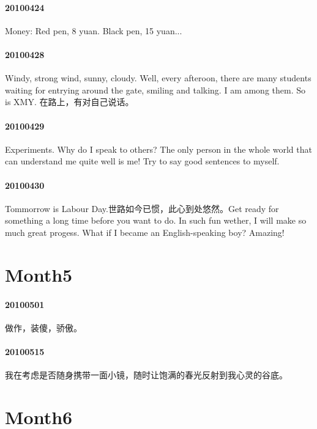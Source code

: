 \documentclass[UTF8]{book}
\begin{document}
\paragraph{20100424}

Money: Red pen, 8 yuan. Black pen, 15 yuan...


\paragraph{20100428}

Windy, strong wind, sunny, cloudy. 
Well, every afteroon, there are many students waiting for entrying around the gate, smiling and talking. I am among them. So is XMY.
在路上，有对自己说话。


\paragraph{20100429}

Experiments. Why do I speak to others? The only person in the whole world that can understand me quite well is me! Try to say good sentences to myself.


\paragraph{20100430}

Tommorrow is Labour Day.世路如今已惯，此心到处悠然。Get ready for something a long time before you want to do. In such fun wether, I will make so much great progess. What if I became an English-speaking boy? Amazing!


\section{Month5}
\paragraph{20100501}

做作，装傻，骄傲。


\paragraph{20100515}

我在考虑是否随身携带一面小镜，随时让饱满的春光反射到我心灵的谷底。

\section{Month6}
\end{document}
